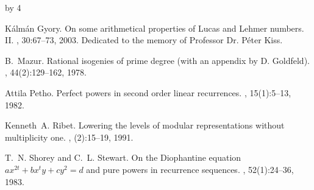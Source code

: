 \documentclass[12pt]{scrartcl}
\def\anzspalten{4}
\newlength{\kastenwidth}
\newenvironment{kasten}{%
  \begin{lrbox}{\dummybox}%
    \begin{minipage}{0.96\linewidth}}%
    {\end{minipage}%
  \end{lrbox}%
  \raisebox{-\depth}{\psshadowbox[framesep=1em]{\usebox{\dummybox}}}\\[0.5em]}
\newenvironment{spalte}{%
  \setlength\kastenwidth{1.2\textwidth}
  \divide\kastenwidth by \anzspalten
  \begin{minipage}[t]{\kastenwidth}}{\end{minipage}\hfill}
\begin{document}
\begin{lrbox}{\spalten}
{\begin{spalte}
\begin{kasten}
{\begin{thebibliography}{10}



K{\'a}lm{\'a}n Gyory.
\newblock On some arithmetical properties of {L}ucas and {L}ehmer numbers.
  {II}.
, 30:67--73,
  2003.
\newblock Dedicated to the memory of Professor Dr. P{\'e}ter Kiss.

B.~Mazur.
\newblock Rational isogenies of prime degree (with an appendix by {D}.
  {G}oldfeld).
, 44(2):129--162, 1978.



Attila Petho.
\newblock Perfect powers in second order linear recurrences.
, 15(1):5--13, 1982.

Kenneth~A. Ribet.
\newblock Lowering the levels of modular representations without multiplicity
  one.
, (2):15--19, 1991.


T.~N. Shorey and C.~L. Stewart.
\newblock On the {D}iophantine equation {$ax^{2t}+bx^{t}y+cy^{2}=d$} and pure
  powers in recurrence sequences.
, 52(1):24--36, 1983.


\end{thebibliography}}
\end{kasten}
\end{spalte}}
\end{lrbox}
\end{document}
